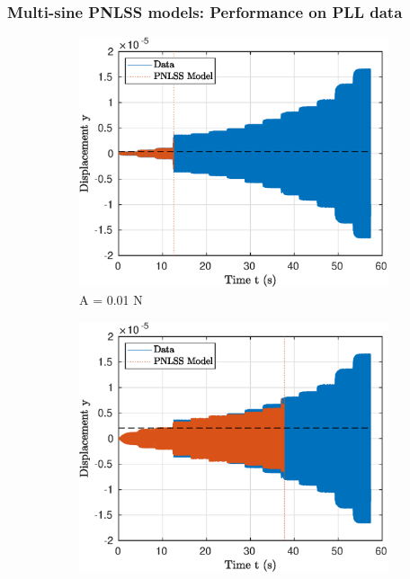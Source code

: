 \documentclass[aspectratio=169]{beamer}
\begin{document}
\begin{frame}[allowframebreaks]
  \frametitle{Multi-sine PNLSS models: Performance on PLL data}
  \vspace{-0.5cm}
  \begin{figure}[!h]
    \centering
    \begin{subfigure}[!h]{0.2\linewidth}
      \includegraphics[width=\linewidth]{../../benchmark4/FIGURES/PNLSS_PLL_TRESP_famp001_nx23}
      \caption{A = 0.01 N}      
    \end{subfigure}%
    \begin{subfigure}[!h]{0.2\linewidth}
      \includegraphics[width=\linewidth]{../../benchmark4/FIGURES/PNLSS_PLL_TRESP_famp01_nx23}

\end{subfigure}
\end{figure}
\end{frame}
\end{document}
